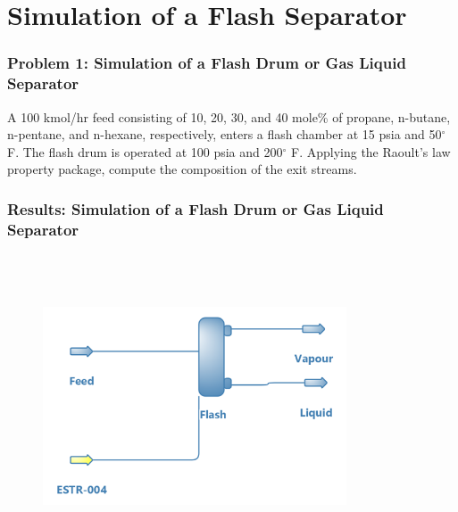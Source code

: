 \documentclass[10pt]{beamer}
\begin{document}
\section{Simulation of a Flash Separator}
\begin{frame}
\frametitle{Problem 1: Simulation of a Flash Drum or Gas Liquid Separator}
A 100 kmol/hr feed consisting of 10, 20, 30, and 40 mole\% of propane,
n-butane, n-pentane, and n-hexane, respectively, enters a flash chamber
at 15 psia and 50$^\circ$F. The flash drum is operated at 100 psia and 200$^\circ$ F. Applying the Raoult’s law property
package, compute the composition of the exit streams.
\end{frame}


\begin{frame}
	\frametitle{Results: Simulation of a Flash Drum or Gas Liquid Separator}
	\begin{figure}
		\begin{center}
			\includegraphics[width=9cm,height=9cm,keepaspectratio]{flash.png}
		\end{center}
	\end{figure}
\end{frame}
\end{document}
